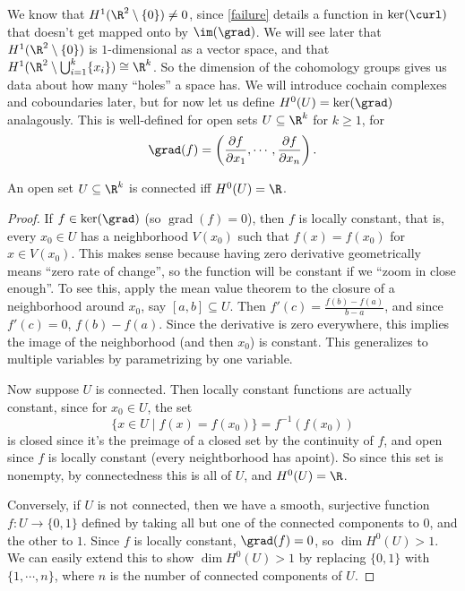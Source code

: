 We know that $H^1(\R^2 \setminus \{0\} )\neq 0$, since \cref{failure} details a function in $\ker(\curl)$ that doesn't get mapped onto by $\im(\grad)$. We will see later that $H^1(\R^2 \setminus \{0\} )$ is $1$-dimensional as a vector space, and that $H^1(\R^2 \setminus \bigcup_{i=1} ^k \{x_i \} )\cong \R^k $. So the dimension of the cohomology groups gives us data about how many ``holes'' a space has. We will introduce cochain complexes and coboundaries later, but for now let us define $H^0(U)=\ker(\grad)$ analagously. This is well-defined for open sets $U\subseteq \R^k$ for $k\geq 1$, for \[
    \grad(f)= \left( \frac{\partial f}{\partial x_1},\cdots ,\frac{\partial f}{\partial x_n } \right).
\] 
\begin{theorem}
    An open set $U\subseteq \R^k$ is connected iff $H^0(U)=\R$.
\end{theorem}
\begin{proof}
    If $f \in \ker(\grad)$ (so $\operatorname{grad}(f)=0$), then $f$ is locally constant, that is, every $x_0 \in U$ has a neighborhood $V(x_0)$ such that $f(x)=f(x_0)$ for $x \in V(x_0)$. This makes sense because having zero derivative geometrically means ``zero rate of change'', so the function will be constant if we ``zoom in close enough''. To see this, apply the mean value theorem to the closure of a neighborhood around $x_0$, say $[a,b]\subseteq U$. Then $f'(c)=\frac{f(b)-f(a)}{b-a}$, and since $f'(c)=0$, $f(b)-f(a)$. Since the derivative is zero everywhere, this implies the image of the neighborhood (and then $x_0$) is constant. This generalizes to multiple variables by parametrizing by one variable.

Now suppose $U$ is connected. Then locally constant functions are actually constant, since for $x_0 \in U$, the set \[
    \{x\in U \mid f(x)=f(x_0)\} =f^{-1}(f(x_0))
\] is closed since it's the preimage of a closed set by the continuity of $f$, and open since $f$ is locally constant (every neightborhood has apoint). So since this set is nonempty, by connectedness this is all of $U$, and $H^0(U)=\R$.

Conversely, if $U$ is not connected, then we have a smooth, surjective function $f \colon U \to \{0,1\} $ defined by taking all but one of the connected components to $0$, and the other to $1$. Since $f$ is locally constant, $\grad (f)=0$, so $\dim H^0 (U)>1$. We can easily extend this to show $\dim H^0(U)>1$ by replacing $\{0,1\} $ with $\{1,\cdots ,n\} $, where $n$ is the number of connected components of $U$.
\end{proof}

